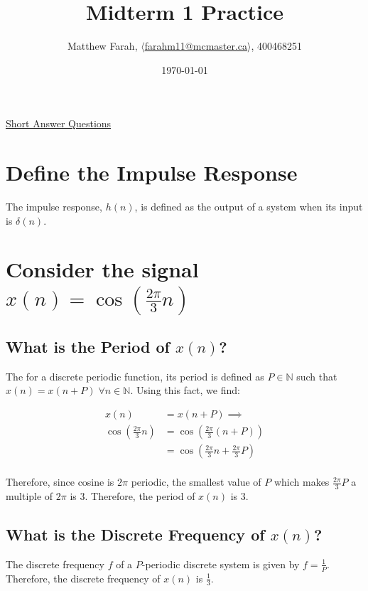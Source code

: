\documentclass{article}
\title{Midterm 1 Practice}
\author{Matthew Farah, \href{mailto:farahm11@mcmaster.ca}{$\langle$farahm11@mcmaster.ca$\rangle$}, 400468251}
\date{\today}
\renewcommand{\thesubsection}{\thesection.\alph{subsection}}
\begin{document}
\maketitle
\pagestyle{fancy}

\begin{center}
	\Large{\underline{Short Answer Questions}}
\end{center}

\section[Question ~\thesection]{Define the Impulse Response}

The impulse response, $h(n)$, is defined as the output of a system when its input is $\delta(n)$.

\section[Question ~\thesection]{Consider the signal $x(n) = \cos{(\frac{2\pi}{3}n)}$}

\subsection[~\thesubsection]{What is the Period of $x(n)$?}

The for a discrete periodic function, its period is defined as $P \in \mathbb{N}$ such that $x(n) = x(n + P) \; \forall n \in \mathbb{N}$. Using this fact, we find:

\begin{align*}
	x(n) &= x(n + P) \implies \\
	\cos{(\frac{2\pi}{3}n)} &= \cos{(\frac{2\pi}{3}(n + P))} \\
	&= \cos{(\frac{2\pi}{3}n + \frac{2\pi}{3}P)} \\
\end{align*}

Therefore, since cosine is $2\pi$ periodic, the smallest value of $P$ which makes $\frac{2\pi}{3}P$ a multiple of $2\pi$ is 3. Therefore, the period of $x(n)$ is 3.

\subsection[~\thesubsection]{What is the Discrete Frequency of $x(n)$?}

The discrete frequency $f$ of a $P$-periodic discrete system is given by $f = \frac{1}{P}$. Therefore, the discrete frequency of $x(n)$ is $\frac{1}{3}$.
\end{document}
